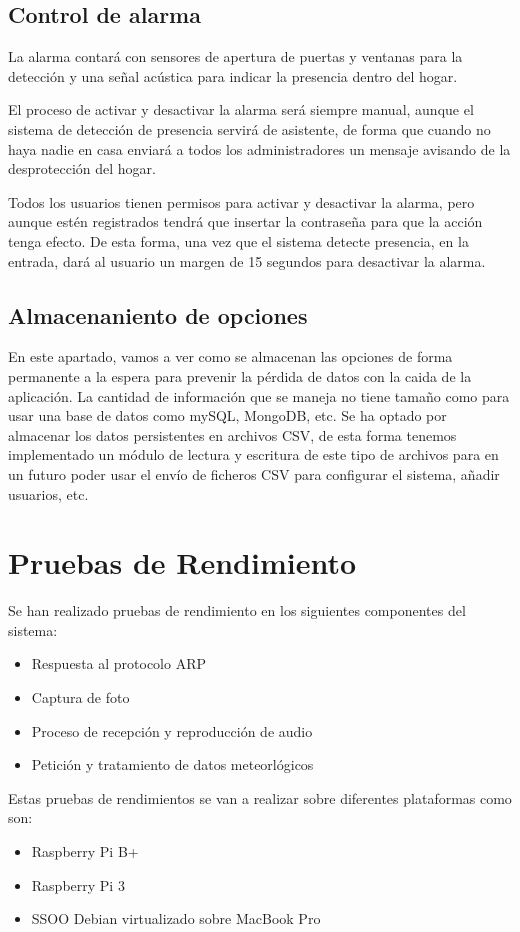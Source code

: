 \documentclass[10pt,journal,compsoc]{IEEEtran}
\begin{document}
\subsection{Control de alarma}
La alarma contará con sensores de apertura de puertas y ventanas para la 
detección y una señal acústica para indicar la presencia dentro del hogar.

El proceso de activar y desactivar la alarma será siempre manual, aunque el 
sistema de detección de presencia servirá de asistente, de forma que cuando no 
haya nadie en casa enviará a todos los administradores un mensaje avisando de la 
desprotección del hogar. 

Todos los usuarios tienen permisos para activar y desactivar la alarma, pero 
aunque estén registrados tendrá que insertar la contraseña para que la acción 
tenga efecto. De esta forma, una vez que el sistema detecte presencia, en la 
entrada, dará al usuario un margen de 15 segundos para desactivar la alarma.

\subsection{Almacenaniento de opciones}
En este apartado, vamos a ver como se almacenan las opciones de forma permanente a la 
espera para prevenir la pérdida de datos con la caida de la aplicación. La cantidad de 
información que se maneja no tiene tamaño como para usar una base de datos como 
mySQL, MongoDB, etc. 
Se ha optado por almacenar los datos persistentes en archivos CSV, de esta forma 
tenemos implementado un módulo de lectura y escritura de este tipo de archivos para 
en un futuro poder usar el envío de ficheros CSV para configurar el sistema, añadir usuarios, etc.

\section{Pruebas de Rendimiento}
Se han realizado pruebas de rendimiento en los siguientes componentes del sistema:
\begin{itemize}
  \item Respuesta al protocolo ARP
  \item Captura de foto
  \item Proceso de recepción y reproducción de audio
  \item Petición y tratamiento de datos meteorlógicos
\end{itemize}

Estas pruebas de rendimientos se van a realizar sobre diferentes 
plataformas como son:
\begin{itemize}
\item Raspberry Pi B+
\item Raspberry Pi 3
\item SSOO Debian virtualizado sobre MacBook Pro
\end{itemize}
\end{document}
